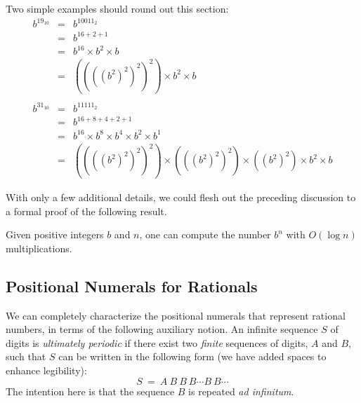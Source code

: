 \smallskip

Two simple examples should round out this section:
\begin{eqnarray*}
b^{19_{10}} & = & b^{10011_{2}} \\
        & = & b^{16 + 2 + 1} \\
        & = & b^{16} \times b^2 \times b \\
        & = & ((((b^2)^2)^2)^2) \times b^2 \times b \\
        &    & \\
b^{31_{10}} & = & b^{11111_{2}} \\
    & = & b^{16 + 8 + 4 + 2 + 1} \\
    & = & b^{16} \times b^8 \times b^4 \times b^2 \times b^1 \\
    & = & ((((b^2)^2)^2)^2) \times (((b^2)^2)^2) \times ((b^2)^2) \times b^2 \times b
\end{eqnarray*} 

\medskip

With only a few additional details, we could flesh out the preceding discussion to a formal proof of the following result.


\begin{prop}
\label{thm:fast-exponentiation}
Given positive integers $b$ and $n$, one can compute the number $b^n$ with $O(\log n)$ multiplications.
\end{prop}


\subsection{Positional Numerals for Rationals}
\label{sec:special-numerals-Q}


We can completely characterize the positional numerals that represent rational numbers, in terms of the following auxiliary notion.  An infinite sequence $S$ of digits is {\em ultimately periodic} if there exist two {\em finite} sequences of digits, $A$ and $B$, such that $S$ can be written in the following form (we have added spaces to enhance legibility):
\begin{equation}
\label{eq:ult-per-seq}
 S \ = \ A \ B \ B \ B \cdots B \ B \cdots
\end{equation}
The intention here is that the sequence $B$ is repeated {\it ad infinitum}.

\smallskip

